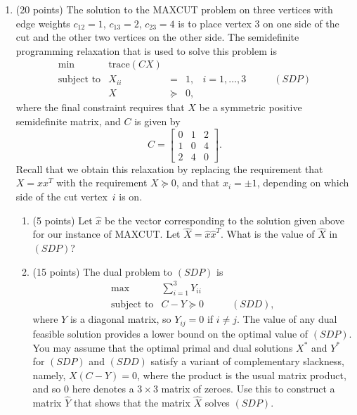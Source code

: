 \begin{enumerate}
\item (20 points)
The solution to the MAXCUT problem on three vertices with edge weights
$c_{12}=1$, $c_{13}=2$, $c_{23}=4$ is to place vertex 3 on one side
of the cut and the other two vertices on the other side.
The semidefinite programming relaxation that is used to solve this
problem is
\begin{displaymath}
\begin{array}{lrcllr}
\min & \mbox{trace}(CX) \\
\mbox{subject to} & X_{ii} & = & 1, & i=1,\ldots,3  & \qquad (SDP)\\
& X & \succeq & 0,
\end{array}
\end{displaymath}
where the final constraint requires that $X$ be a symmetric positive
semidefinite matrix, and $C$ is given by
\begin{displaymath}
C = \left[ \begin{array}{rrr}0&1&2\\1&0&4\\2&4&0\end{array} \right] .
\end{displaymath}
Recall that we obtain this relaxation by replacing the requirement
that $X=xx^T$ with the requirement $X\succeq 0$,
and that $x_i=\pm 1$, depending on which side of the cut vertex~$i$ is on.
\begin{enumerate}
\item (5 points)
Let $\hat{x}$ be the vector corresponding to the solution given
above for our instance of MAXCUT.
Let $\hat{X}=\hat{x}\hat{x}^T$.
What is the value of $\hat{X}$ in $(SDP)$?
\item (15 points)
The dual problem to $(SDP)$ is
\begin{displaymath}
\begin{array}{llr}
\max & \sum_{i=1}^3 Y_{ii}  \\
\mbox{subject to} & C - Y \succeq 0 & \qquad (SDD),
\end{array}
\end{displaymath}
where $Y$ is a diagonal matrix,
so $Y_{ij}=0$ if $i\neq j$.
The value of any dual feasible solution provides a lower bound on the
optimal value of $(SDP)$.
You may assume that the optimal primal and dual solutions $X^*$
and $Y^*$ for $(SDP)$ and $(SDD)$ satisfy a variant of
complementary slackness, namely, $X(C-Y)=0$, where the product
is the usual matrix product, and so $0$ here denotes a $3\times 3$
matrix of zeroes.
Use this to construct a matrix $\hat{Y}$ that shows that the
matrix $\hat{X}$ solves $(SDP)$.
\end{enumerate}
\end{enumerate}



